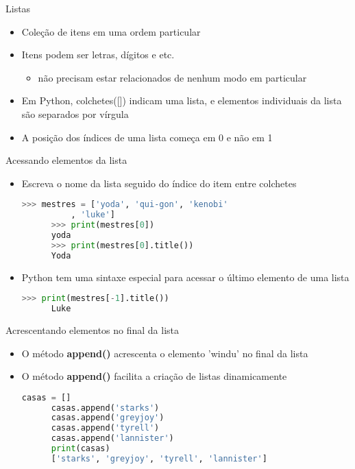 
\begin{frame}{Listas}
  \begin{itemize}
    \item Coleção de itens em uma ordem particular
    \item Itens podem ser letras, dígitos e etc.
    \begin{itemize}
      \item não precisam estar relacionados de nenhum modo em particular
    \end{itemize}
    \item Em Python, colchetes([]) indicam uma lista, e elementos individuais da
      lista são separados por vírgula
    \item A posição dos índices de uma lista começa em 0 e não em 1
  \end{itemize}
\end{frame}
%
\begin{frame}{Acessando elementos da lista}
  \begin{itemize}
    \item Escreva o nome da lista seguido do índice do item entre colchetes
  
    \begin{lstlisting}[language=python]
      >>> mestres = ['yoda', 'qui-gon', 'kenobi'
          , 'luke']
      >>> print(mestres[0])
      yoda
      >>> print(mestres[0].title())
      Yoda
    \end{lstlisting}
    \item Python tem uma sintaxe especial para acessar o último elemento de uma lista
    \begin{lstlisting}[language=python]
      >>> print(mestres[-1].title())
      Luke
    \end{lstlisting}
  \end{itemize}
\end{frame}
%
\begin{frame}{Acrescentando elementos no final da lista}
  \begin{itemize}
    \begin{lstlisting}[language=python]
      >>> mestres = ['yoda', 'qui-gon', 'kenobi'
          , 'luke']
      >>> mestres.append('windu')
      >>> print(mestres)
      ['yoda', 'qui-gon', 'kenobi', 'luke', 'windu']
    \end{lstlisting}
    \item O método {\bf append()} acrescenta o elemento 'windu' no final da lista 
    \pagebreak
    \item O método {\bf append()} facilita a criação de listas dinamicamente
    \begin{lstlisting}[language=python]
      casas = []
      casas.append('starks')
      casas.append('greyjoy')
      casas.append('tyrell')
      casas.append('lannister')
      print(casas)
      ['starks', 'greyjoy', 'tyrell', 'lannister']
    \end{lstlisting}
  \end{itemize}
\end{frame}

